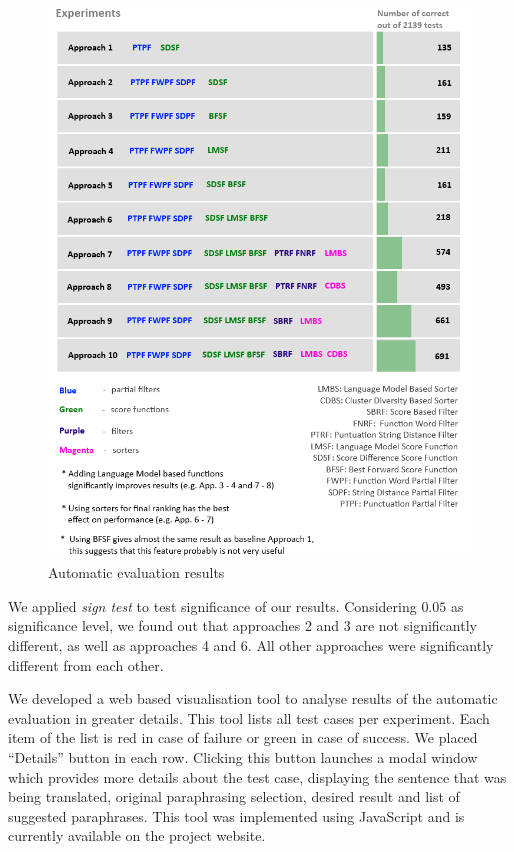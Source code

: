 \begin{figure}
 \centering 
 \includegraphics[scale=0.85]{g/eval-results-2.png}
 \caption{Automatic evaluation results}
\end{figure}


We applied \emph{sign test} to test significance of our results. Considering $0.05$ as significance level, we found out that approaches 2 and 3 are not significantly different, as well as approaches 4 and 6. All other approaches were significantly different from each other. 

We developed a web based visualisation tool to analyse results of the automatic evaluation in greater details. This tool lists all test cases per experiment. Each item of the list is red in case of failure or green in case of success. We placed ``Details'' button in each row. Clicking this button launches a modal window which provides more details about the test case, displaying the sentence that was being translated, original paraphrasing selection, desired result and list of suggested paraphrases. This tool was implemented using JavaScript and is currently available on the project website. 

